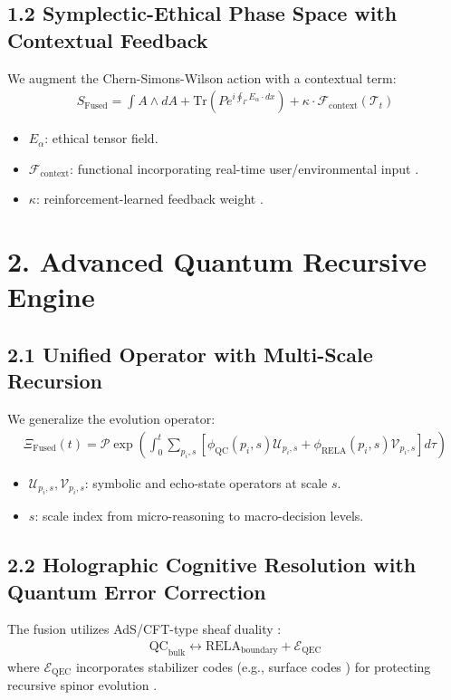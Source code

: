 \documentclass[12pt]{article}
\begin{document}
\subsection*{1.2 Symplectic-Ethical Phase Space with Contextual Feedback}
We augment the Chern-Simons-Wilson action \cite{witten1989quantum} with a contextual term:
\begin{align}
S_{\text{Fused}} = \int A \wedge dA + \text{Tr}\left(P e^{i\oint_\Gamma E_\alpha \cdot dx}\right) + \kappa \cdot \mathcal{F}_{\text{context}}(\mathcal{T}_t)
\end{align}
\begin{itemize}
  \item $E_\alpha$: ethical tensor field.
  \item $\mathcal{F}_{\text{context}}$: functional incorporating real-time user/environmental input \cite{cohen2022ethics}.
  \item $\kappa$: reinforcement-learned feedback weight \cite{barak2021machine}.
\end{itemize}

\section*{2. Advanced Quantum Recursive Engine}
\subsection*{2.1 Unified Operator with Multi-Scale Recursion}
We generalize the evolution operator:
\begin{align}
\Xi_{\text{Fused}}(t) = \mathcal{P} \exp\left( \int_0^t \sum_{p_i, s} \left[ \phi_{\text{QC}}(p_i, s) \mathcal{U}_{p_i, s} + \phi_{\text{RELA}}(p_i, s) \mathcal{V}_{p_i, s} \right] d\tau \right)
\end{align}
\begin{itemize}
  \item $\mathcal{U}_{p_i,s}, \mathcal{V}_{p_i,s}$: symbolic and echo-state operators at scale $s$.
  \item $s$: scale index from micro-reasoning to macro-decision levels.
\end{itemize}

\subsection*{2.2 Holographic Cognitive Resolution with Quantum Error Correction}
The fusion utilizes AdS/CFT-type sheaf duality \cite{maldacena1998anti}:
\begin{align}
\text{QC}_{\text{bulk}} \leftrightarrow \text{RELA}_{\text{boundary}} + \mathcal{E}_{\text{QEC}}
\end{align}
where $\mathcal{E}_{\text{QEC}}$ incorporates stabilizer codes (e.g., surface codes \cite{fowler2012surface}) for protecting recursive spinor evolution \cite{haah2011local}.
\end{document}
